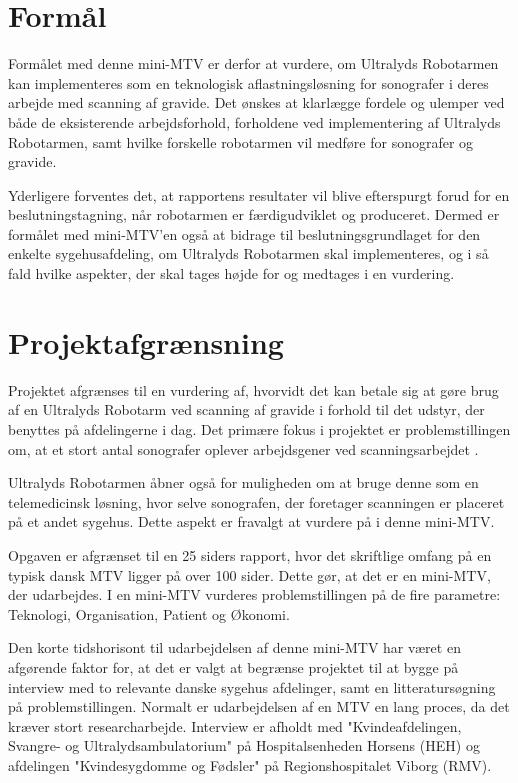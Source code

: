 
\section{Formål}
Formålet med denne mini-MTV er derfor at vurdere, om Ultralyds Robotarmen kan implementeres som en teknologisk aflastningsløsning for sonografer i deres arbejde med scanning af gravide. Det ønskes at klarlægge fordele og ulemper ved både de eksisterende arbejdsforhold, forholdene ved implementering af Ultralyds Robotarmen, samt hvilke forskelle robotarmen vil medføre for sonografer og gravide.

Yderligere forventes det, at rapportens resultater vil blive efterspurgt forud for en beslutningstagning, når robotarmen er færdigudviklet og produceret. Dermed er formålet med mini-MTV’en også at bidrage til beslutningsgrundlaget for den enkelte sygehusafdeling, om Ultralyds Robotarmen skal implementeres, og i så fald hvilke aspekter, der skal tages højde for og medtages i en vurdering.

\section{Projektafgrænsning}
Projektet afgrænses til en vurdering af, hvorvidt det kan betale sig at gøre brug af en Ultralyds Robotarm ved scanning af gravide i forhold til det udstyr, der benyttes på afdelingerne i dag. Det primære fokus i projektet er problemstillingen om, at et stort antal sonografer oplever arbejdsgener ved scanningsarbejdet \cite{1}\cite{24}\cite{30}\cite{31}\cite{36}. 

Ultralyds Robotarmen åbner også for muligheden om at bruge denne som en telemedicinsk løsning, hvor selve sonografen, der foretager scanningen er placeret på et andet sygehus. Dette aspekt er fravalgt at vurdere på i denne mini-MTV. 

Opgaven er afgrænset til en 25 siders rapport, hvor det skriftlige omfang på en typisk dansk MTV ligger på over 100 sider. Dette gør, at det er en mini-MTV, der udarbejdes. I en mini-MTV vurderes problemstillingen på de fire parametre: Teknologi, Organisation, Patient og Økonomi. 

Den korte tidshorisont til udarbejdelsen af denne mini-MTV har været en afgørende faktor for, at det er valgt at begrænse projektet til at bygge på interview med to relevante danske sygehus afdelinger, samt en litteratursøgning på problemstillingen. Normalt er udarbejdelsen af en MTV en lang proces, da det kræver stort researcharbejde. Interview er afholdt med "Kvindeafdelingen, Svangre- og Ultralydsambulatorium" på Hospitalsenheden Horsens (HEH) og afdelingen "Kvindesygdomme og Fødsler" på Regionshospitalet Viborg (RMV).

